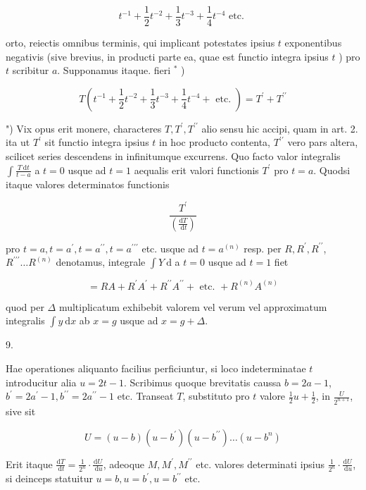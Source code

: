 \documentclass[10pt]{article}
\begin{document}
\[
t^{-1}+\frac{1}{2} t^{-2}+\frac{1}{3} t^{-3}+\frac{1}{4} t^{-4} \text { etc. }
\]

orto, reiectis omnibus terminis, qui implicant potestates ipsius \(t\) exponentibus negativis (sive brevius, in producti parte ea, quae est functio integra ipsius \(t\) ) pro \(t\) scribitur \(a\). Supponamus itaque. fieri \({ }^{*}\) )

\[
T\left(t^{-1}+\frac{1}{2} t^{-2}+\frac{1}{3} t^{-3}+\frac{1}{4} t^{-4}+\text { etc. }\right)=T^{\prime}+T^{\prime \prime}
\]

") Vix opus erit monere, characteres \(T, T^{\prime}, T^{\prime \prime}\) alio sensu hic accipi, quam in art. 2.
ita ut \(T^{\prime}\) sit functio integra ipsius \(t\) in hoc producto contenta, \(T^{\prime \prime}\) vero pars altera, scilicet series descendens in infinitumque excurrens. Quo facto valor integralis \(\int \frac{T \mathrm{~d} t}{t-a}\) a \(t=0\) usque ad \(t=1\) aequalis erit valori functionis \(T^{\prime}\) pro \(t=a\). Quodsi itaque valores determinatos functionis

\[
\frac{T^{\prime}}{\left(\frac{\mathrm{d} T}{\mathrm{~d} t}\right)}
\]

pro \(t=a, t=a^{\prime}, t=a^{\prime \prime}, t=a^{\prime \prime \prime}\) etc. usque ad \(t=a^{(n)}\) resp. per \(R, R^{\prime}, R^{\prime \prime}\), \(R^{\prime \prime \prime} \ldots R^{(n)}\) denotamus, integrale \(\int Y \mathrm{~d}\) a \(t=0\) usque ad \(t=1\) fiet

\[
=R A+R^{\prime} A^{\prime}+R^{\prime \prime} A^{\prime \prime}+\text { etc. }+R^{(n)} A^{(n)}
\]

quod per \(\Delta\) multiplicatum exhibebit valorem vel verum vel approximatum integralis \(\int y \mathrm{~d} x\) ab \(x=g\) usque ad \(x=g+\Delta\).

9.

Hae operationes aliquanto facilius perficiuntur, si loco indeterminatae \(t\) introducitur alia \(u=2 t-1\). Scribimus quoque brevitatis caussa \(b=2 a-1\), \(b^{\prime}=2 a^{\prime}-1, b^{\prime \prime}=2 a^{\prime \prime}-1\) etc. Transeat \(T\), substituto pro \(t\) valore \(\frac{1}{2} u+\frac{1}{2}\), in \(\frac{U}{2^{n+1}}\), sive sit

\[
U=(u-b)\left(u-b^{\prime}\right)\left(u-b^{\prime \prime}\right) \ldots\left(u-b^{n}\right)
\]

Erit itaque \(\frac{\mathrm{d} T}{\mathrm{~d} t}=\frac{1}{2^{n}} \cdot \frac{\mathrm{d} U}{\mathrm{~d} u}\), adeoque \(M, M^{\prime}, M^{\prime \prime}\) etc. valores determinati ipsius \(\frac{1}{2^{n}} \cdot \frac{\mathrm{d} U}{\mathrm{~d} u}\), si deinceps statuitur \(u=b, u=b^{\prime}, u=b^{\prime \prime}\) etc.
\end{document}

